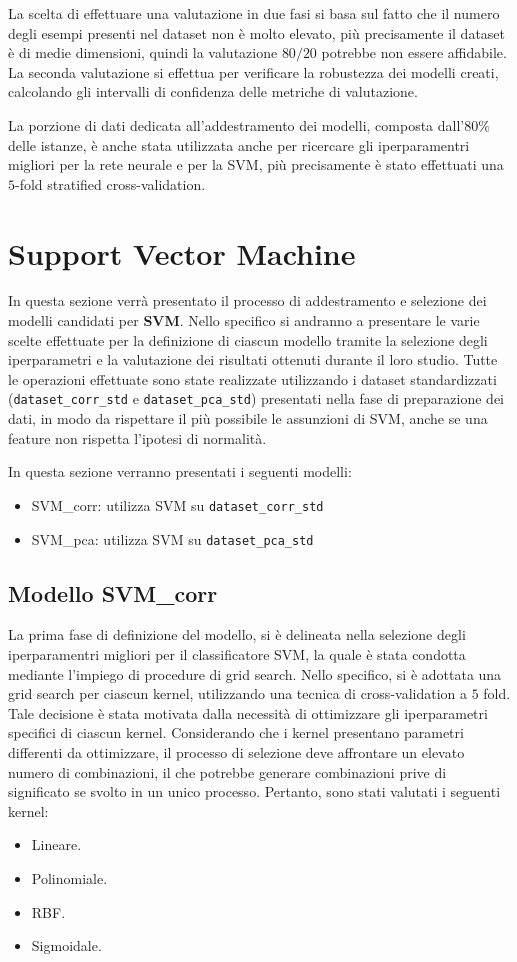 La scelta di effettuare una valutazione in due fasi si basa sul fatto che il
numero degli esempi presenti nel dataset non è molto elevato, più precisamente
il dataset è di medie dimensioni, quindi la valutazione $80/20$ potrebbe non
essere affidabile. La seconda valutazione si effettua per verificare la
robustezza dei modelli creati, calcolando gli intervalli di confidenza delle
metriche di valutazione.

La porzione di dati dedicata all'addestramento dei modelli, composta dall'$80\%$
delle istanze, è anche stata utilizzata anche per ricercare gli iperparamentri
migliori per la rete neurale e per la SVM, più precisamente è stato effettuati
una $5$-fold stratified cross-validation.
\section{Support Vector Machine}
In questa sezione verrà presentato il processo di addestramento e selezione dei
modelli candidati per \textbf{SVM}. Nello specifico si andranno a presentare le
varie scelte effettuate per la definizione di ciascun modello tramite la selezione
degli iperparametri e la valutazione dei risultati ottenuti durante il loro studio. 
Tutte le operazioni effettuate sono state realizzate utilizzando i dataset standardizzati
(\texttt{dataset\_corr\_std} e \texttt{dataset\_pca\_std}) presentati nella fase
di preparazione dei dati, in modo da rispettare il più possibile le assunzioni
di SVM, anche se una feature non rispetta l'ipotesi di normalità. 

In questa sezione verranno presentati i seguenti modelli:
\begin{itemize}
    \item SVM\_corr: utilizza SVM su \texttt{dataset\_corr\_std}
    \item SVM\_pca: utilizza SVM su \texttt{dataset\_pca\_std}
\end{itemize}

\subsection{Modello SVM\_corr}
La prima fase di definizione del modello, si è delineata nella selezione degli 
iperparamentri migliori per il classificatore SVM, la quale è stata
condotta mediante l'impiego di procedure di grid search. Nello specifico, si è
adottata una grid search per ciascun kernel, utilizzando una tecnica di
cross-validation a $5$ fold. Tale decisione è stata motivata dalla necessità di
ottimizzare gli iperparametri specifici di ciascun kernel. Considerando che i
kernel presentano parametri differenti da ottimizzare, il processo di selezione
deve affrontare un elevato numero di combinazioni, il che potrebbe generare
combinazioni prive di significato se svolto in un unico processo. Pertanto, sono
stati valutati i seguenti kernel:
\begin{itemize}
    \item Lineare.
    \item Polinomiale.
    \item RBF.
    \item Sigmoidale.
\end{itemize}

